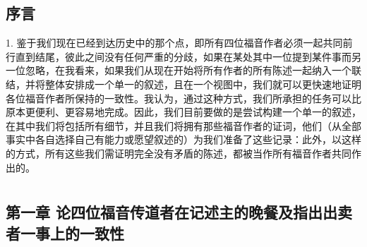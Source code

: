 \par


\subsection{序言}

1. 鉴于我们现在已经到达历史中的那个点，即所有四位福音作者必须一起共同前行直到结尾，彼此之间没有任何严重的分歧，如果在某处其中一位提到某件事而另一位忽略，在我看来，如果我们从现在开始将所有作者的所有陈述一起纳入一个联结，并将整体安排成一个单一的叙述，且在一个视图中，我们就可以更快速地证明各位福音作者所保持的一致性。我认为，通过这种方式，我们所承担的任务可以比原本更便利、更容易地完成。因此，我们目前要做的是尝试构建一个单一的叙述，在其中我们将包括所有细节，并且我们将拥有那些福音作者的证词，他们（从全部事实中各自选择自己有能力或愿望叙述的）为我们准备了这些记录：此外，以这样的方式，所有这些我们需证明完全没有矛盾的陈述，都被当作所有福音作者共同作出的。\par



\section{}


\subsection{第一章 论四位福音传道者在记述主的晚餐及指出出卖者一事上的一致性}

